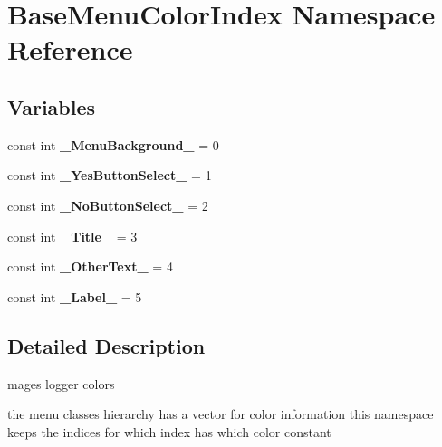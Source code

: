 \hypertarget{namespace_base_menu_color_index}{}\section{Base\+Menu\+Color\+Index Namespace Reference}
\label{namespace_base_menu_color_index}
\subsection*{Variables}
\begin{DoxyCompactItemize}
\item 
\hypertarget{namespace_base_menu_color_index_abd8c272dac8688636684f7c021ecbe21}{}\label{namespace_base_menu_color_index_abd8c272dac8688636684f7c021ecbe21} 
const int {\bfseries \+\_\+\+Menu\+Background\+\_\+} = 0
\item 
\hypertarget{namespace_base_menu_color_index_a970c811416f3f2d80192dc0f22493d63}{}\label{namespace_base_menu_color_index_a970c811416f3f2d80192dc0f22493d63} 
const int {\bfseries \+\_\+\+Yes\+Button\+Select\+\_\+} = 1
\item 
\hypertarget{namespace_base_menu_color_index_a6614ec9cc358cc44f30adbe6c50ae59f}{}\label{namespace_base_menu_color_index_a6614ec9cc358cc44f30adbe6c50ae59f} 
const int {\bfseries \+\_\+\+No\+Button\+Select\+\_\+} = 2
\item 
\hypertarget{namespace_base_menu_color_index_aef35d9d3b2f7bdacc9bd67be93779101}{}\label{namespace_base_menu_color_index_aef35d9d3b2f7bdacc9bd67be93779101} 
const int {\bfseries \+\_\+\+Title\+\_\+} = 3
\item 
\hypertarget{namespace_base_menu_color_index_a00892e91c5696d84522744278d3e00c8}{}\label{namespace_base_menu_color_index_a00892e91c5696d84522744278d3e00c8} 
const int {\bfseries \+\_\+\+Other\+Text\+\_\+} = 4
\item 
\hypertarget{namespace_base_menu_color_index_ad83b49fb37caeafdca6be67c60d817f9}{}\label{namespace_base_menu_color_index_ad83b49fb37caeafdca6be67c60d817f9} 
const int {\bfseries \+\_\+\+Label\+\_\+} = 5
\end{DoxyCompactItemize}


\subsection{Detailed Description}
mages logger colors

the menu classes hierarchy has a vector for color information this namespace keeps the indices for which index has which color constant 